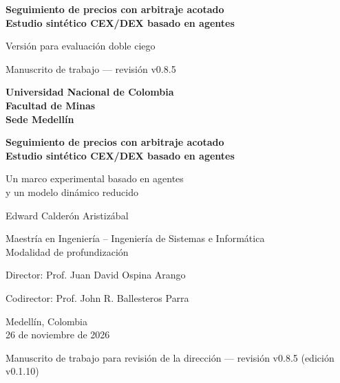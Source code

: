 \documentclass[11pt,letterpaper]{report}
\newcommand{\versionTesis}{v0.1.10}
\newcommand{\revisionManuscrito}{v0.8.5}
\numberwithin{equation}{chapter}
\begin{document}
\begin{titlepage}
  \thispagestyle{empty}
  \centering
  \singlespacing
  \ifdefined\blindreviewmode
  \vspace*{4cm}
  {\LARGE\bfseries Seguimiento de precios con arbitraje acotado\\
  Estudio sintético CEX/DEX basado en agentes\par}
  \vspace{1.2cm}
  {\Large Versión para evaluación doble ciego\par}
  \vfill
  {\small Manuscrito de trabajo --- revisión \revisionManuscrito{}\par}
  \else
  {\large\bfseries Universidad Nacional de Colombia\\[2pt]
  Facultad de Minas\\[2pt]
  Sede Medellín\par}
  \vspace{3.2cm}
  {\LARGE\bfseries Seguimiento de precios con arbitraje acotado\\
  Estudio sintético CEX/DEX basado en agentes\par}
  \vspace{0.9cm}
  {\Large Un marco experimental basado en agentes\\
  y un modelo dinámico reducido\par}
  \vspace{2.6cm}
  {\Large Edward Calderón Aristizábal\par}
  \vspace{1.6cm}
  {\large Maestría en Ingeniería -- Ingeniería de Sistemas e Informática\\[2pt]
  Modalidad de profundización\par}
  \vspace{0.8cm}
  {\large Director: Prof. Juan David Ospina Arango\par}
  {\large Codirector: Prof. John R. Ballesteros Parra\par}
  \vfill
  {\large Medellín, Colombia\\[2pt]
  26 de noviembre de 2026\par}
  \vspace{0.3cm}
  {\small Manuscrito de trabajo para revisión de la dirección --- revisión \revisionManuscrito{} (edición \versionTesis{})\par}
  \fi
\end{titlepage}

\setcounter{page}{1}
\end{document}
